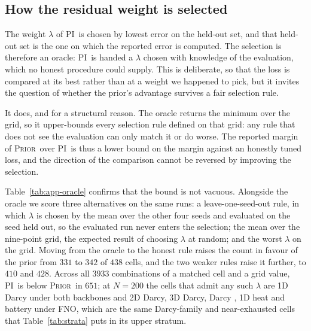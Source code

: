 \documentclass{article}
\newcommand{\armpi}{\textsc{PI}}
\newcommand{\armprior}{\textsc{Prior}}
\begin{document}
\subsection{How the residual weight is selected}
\label{app:oracle}

The weight $\lambda$ of \armpi\ is chosen by lowest error on the held-out
set, and that held-out set is the one on which the reported error is computed. The
selection is therefore an oracle: \armpi\ is handed a $\lambda$ chosen with knowledge
of the evaluation, which no honest procedure could supply. This is deliberate, so
that the loss is compared at its best rather than at a weight we happened to pick,
but it invites the question of whether the prior's advantage survives a fair
selection rule.

It does, and for a structural reason. The oracle returns the minimum over the grid,
so it upper-bounds every selection rule defined on that grid: any rule that does not
see the evaluation can only match it or do worse. The reported margin of \armprior\
over \armpi\ is thus a lower bound on the margin against an honestly tuned loss, and
the direction of the comparison cannot be reversed by improving the selection.

Table~\ref{tab:app-oracle} confirms that the bound is not vacuous. Alongside the
oracle we score three alternatives on the same runs: a leave-one-seed-out rule, in
which $\lambda$ is chosen by the mean over the other four seeds and evaluated on the
seed held out, so the evaluated run never enters the selection; the mean over the
nine-point grid, the expected result of choosing $\lambda$ at random; and the worst
$\lambda$ on the grid. Moving from the oracle to the honest rule raises the count in favour of the
prior from $331$ to $342$ of $438$ cells, and the two weaker rules raise it further, to $410$ and
$428$. Across all $3933$ combinations of a matched cell and a grid value, \armpi\ is below
\armprior\ in $651$; at $N=200$ the cells that admit any such $\lambda$ are 1D Darcy under both
backbones and 2D Darcy, 3D Darcy, Darcy \citep{li2020fourier}, 1D heat and battery under
\textsc{FNO}, which are the same Darcy-family and near-exhausted cells that Table~\ref{tab:strata}
puts in its upper stratum.
\end{document}
